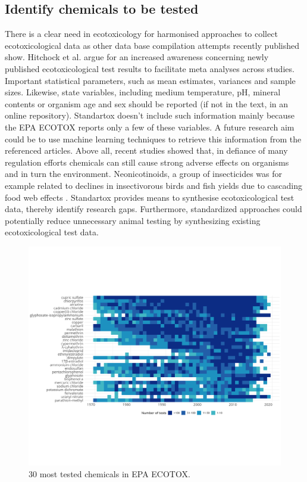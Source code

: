 \subsection*{Identify chemicals to be tested}
There is a clear need in ecotoxicology for harmonised approaches to collect ecotoxicological data as other data base compilation attempts recently published show. Hitchock et al. \citet{hitchcock_improving_2018} argue for an increased awareness concerning newly published ecotoxicological test results to facilitate meta analyses across studies. Important statistical parameters, such as mean estimates, variances and sample sizes. Likewise, state variables, including medium temperature, pH, mineral contents or organism age and sex should be reported (if not in the text, in an online repository). Standartox doesn't include such information mainly because the EPA ECOTOX reports only a few of these variables. A future research aim could be to use machine learning techniques to retrieve this information from the referenced articles.
Above all, recent studies showed that, in defiance of many regulation efforts \citep{schafer_future_2019} chemicals can still cause strong adverse effects on organisms and in turn the environment. Neonicotinoids, a group of insecticides was for example related to declines in insectivorous birds \citep{hallmann_declines_2014} and fish yields due to cascading food web effects \citep{yamamuro_neonicotinoids_2019}. Standartox provides means to synthesise ecotoxicological test data, thereby identify research gaps. Furthermore, standardized approaches could potentially reduce unnecessary animal testing by synthesizing existing ecotoxicological test data.

\begin{figure}
    \includegraphics[width=1\linewidth]{article/figures/heatmap_tests_n.png}
    \caption{30 most tested chemicals in EPA ECOTOX.}
    \label{fig:standartox_ppdb_diff}
\end{figure}


